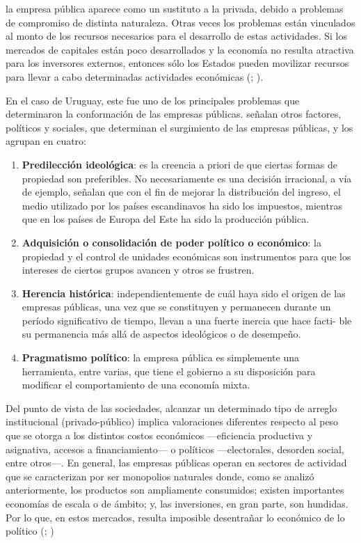 \documentclass[
  12pt,
  spanish,
]{book}
\begin{document}
la empresa pública aparece como un sustituto a la privada, debido a
problemas de compromiso de distinta naturaleza. Otras veces los
problemas están vinculados al monto de los recursos necesarios para el
desarrollo de estas actividades. Si los mercados de capitales están poco
desarrollados y la economía no resulta atractiva para los inversores
externos, entonces sólo los Estados pueden movilizar recursos para
llevar a cabo determinadas actividades económicas (\citet{Mintz1982};
\citet{LaPorta1998}).

En el caso de Uruguay, este fue uno de los principales problemas que
determinaron la conformación de las empresas públicas. \citet{Jones1982}
señalan otros factores, políticos y sociales, que determinan el
surgimiento de las empresas públicas, y los agrupan en cuatro:

\begin{enumerate}
\def\labelenumi{\arabic{enumi}.}
\item
  \textbf{Predilección ideológica}: es la creencia a priori de que
  ciertas formas de propiedad son preferibles. No necesariamente es una
  decisión irracional, a vía de ejemplo, señalan que con el fin de
  mejorar la distribución del ingreso, el medio utilizado por los países
  escandinavos ha sido los impuestos, mientras que en los países de
  Europa del Este ha sido la producción pública.
\item
  \textbf{Adquisición o consolidación de poder político o económico}: la
  propiedad y el control de unidades económicas son instrumentos para
  que los intereses de ciertos grupos avancen y otros se frustren.
\item
  \textbf{Herencia histórica}: independientemente de cuál haya sido el
  origen de las empresas públicas, una vez que se constituyen y
  permanecen durante un período significativo de tiempo, llevan a una
  fuerte inercia que hace facti- ble su permanencia más allá de aspectos
  ideológicos o de desempeño.
\item
  \textbf{Pragmatismo político}: la empresa pública es simplemente una
  herramienta, entre varias, que tiene el gobierno a su disposición para
  modificar el comportamiento de una economía mixta.
\end{enumerate}

Del punto de vista de las sociedades, alcanzar un determinado tipo de
arreglo institucional (privado-público) implica valoraciones diferentes
respecto al peso que se otorga a los distintos costos económicos
---eficiencia productiva y asignativa, accesos a financiamiento--- o
políticos ---electorales, desorden social, entre otros---. En general,
las empresas públicas operan en sectores de actividad que se
caracterizan por ser monopolios naturales donde, como se analizó
anteriormente, los productos son ampliamente consumidos; existen
importantes economías de escala o de ámbito; y, las inversiones, en gran
parte, son hundidas. Por lo que, en estos mercados, resulta imposible
desentrañar lo económico de lo político (\citet{Bergara2003};
\citet{Spiller2013})
\end{document}
